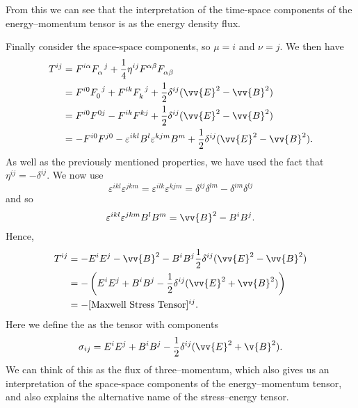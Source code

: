 From this we can see that the interpretation of the time-space components of the energy--momentum tensor is as the energy density flux.

Finally consider the space-space components, so \(\mu = i\) and \(\nu = j\).
We then have
\begin{align}
    T^{ij} &= \tensor{F}{^{i\alpha}}\tensor{F}{_\alpha^j} + \frac{1}{4}\eta^{ij} \tensor{F}{^{\alpha\beta}}\tensor{F}{_{\alpha\beta}}\\
    &= \tensor{F}{^{i0}}\tensor{F}{_0^j} + \tensor{F}{^{ik}}\tensor{F}{_k^j} + \frac{1}{2}\delta^{ij}(\vv{E}^2 - \vv{B}^2)\\
    &= \tensor{F}{^{i0}}\tensor{F}{^{0j}} - \tensor{F}{^{ik}}\tensor{F}{^{kj}} + \frac{1}{2}\delta^{ij}(\vv{E}^2 - \vv{B}^2)\\
    &= -\tensor{F}{^{i0}}\tensor{F}{^{j0}} - \varepsilon^{ikl}B^l\varepsilon^{kjm}B^m + \frac{1}{2}\delta^{ij}(\vv{E}^2 - \vv{B}^2).
\end{align}
As well as the previously mentioned properties, we have used the fact that \(\eta^{ij} = -\delta^{ij}\).
We now use
\begin{equation}
    \varepsilon^{ikl}\varepsilon^{jkm} = \varepsilon^{ilk}\varepsilon^{kjm} = \delta^{ij}\delta^{lm} - \delta^{im}\delta^{lj}
\end{equation}
and so 
\begin{equation}
    \varepsilon^{ikl}\varepsilon^{jkm}B^lB^m = \vv{B}^2 - B^iB^j.
\end{equation}
Hence,
\begin{align}
    T^{ij} &= -E^iE^j - \vv{B}^{2} - B^iB^j \frac{1}{2}\delta^{ij}(\vv{E}^2 - \vv{B}^2)\\
    &= -\left( E^iE^j + B^iB^j - \frac{1}{2}\delta^{ij}(\vv{E}^2 + \vv{B}^2) \right)\\
    &= - [\text{Maxwell Stress Tensor}]^{ij}.
\end{align}
Here we define the  as the tensor with components
\begin{equation}
    \sigma_{ij} = E^iE^j + B^iB^j - \frac{1}{2}\delta^{ij}(\vv{E}^2 + \v{B}^2).
\end{equation}
We can think of this as the flux of three--momentum, which also gives us an interpretation of the space-space components of the energy--momentum tensor, and also explains the alternative name of the stress--energy tensor.

